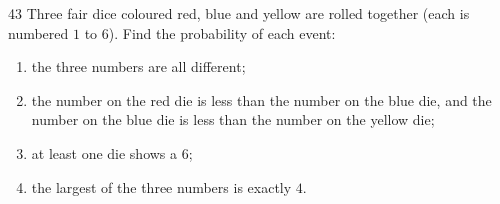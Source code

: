 \begin{probbox}{43}{}
Three fair dice coloured red, blue and yellow are rolled together (each is numbered $1$ to $6$). Find the probability of each event:
\begin{enumerate}[label=\alph*),leftmargin=1.6em,itemsep=1pt,topsep=2pt]
\item the three numbers are all different;
\item the number on the red die is less than the number on the blue die, and the number on the blue die is less than the number on the
yellow die;
\item at least one die shows a $6$;
\item the largest of the three numbers is exactly $4$.
\end{enumerate}
\end{probbox}

